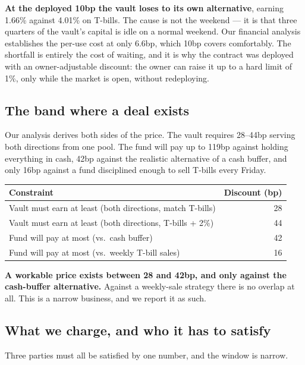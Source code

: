 \documentclass[11pt,a4paper]{article}
\begin{document}
\textbf{At the deployed 10bp the vault loses to its own alternative}, earning 1.66\% against 4.01\% on
T-bills. The cause is not the weekend — it is that three quarters of the vault's capital is idle on a
normal weekend. Our financial analysis establishes the per-use cost at only 6.6bp, which 10bp covers
comfortably. The shortfall is entirely the cost of waiting, and it is why the contract was deployed
with an owner-adjustable discount: the owner can raise it up to a hard limit of 1\%, only while the
market is open, without redeploying.

\subsection{The band where a deal exists}

Our analysis derives both sides of the price. The vault requires 28--44bp serving both directions from
one pool. The fund will pay up to 119bp against holding everything in cash, 42bp against the realistic
alternative of a cash buffer, and only 16bp against a fund disciplined enough to sell T-bills every
Friday.

\begin{center}
\begin{tabular}{@{}lr@{}}
\toprule
\textbf{Constraint} & \textbf{Discount (bp)} \\
\midrule
Vault must earn at least (both directions, match T-bills) & 28 \\
Vault must earn at least (both directions, T-bills + 2\%) & 44 \\
Fund will pay at most (vs.\ cash buffer) & 42 \\
Fund will pay at most (vs.\ weekly T-bill sales) & 16 \\
\bottomrule
\end{tabular}
\end{center}

\textbf{A workable price exists between 28 and 42bp, and only against the cash-buffer alternative.}
Against a weekly-sale strategy there is no overlap at all. This is a narrow business, and we report it
as such.

\subsection{What we charge, and who it has to satisfy}

Three parties must all be satisfied by one number, and the window is narrow.
\end{document}
